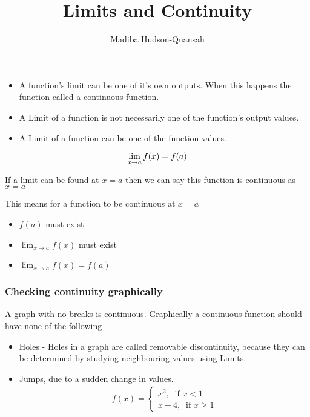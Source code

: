 \documentclass[12pt letter]{report}
\title{\Huge{Limits and Continuity}}
\author{\huge{Madiba Hudson-Quansah}}
\date{}
\begin{document}
\maketitle
\newpage
{}
\tableofcontents
\pagebreak

\chapter{}

\begin{itemize}
	\item A function's limit can be one of it's own outputs. When this happens the function called a continuous function.

	\item A Limit of a function is not necessarily one of the function's output values.

	\item A Limit of a function can be one of the function values.

\end{itemize}

\[
	\lim_{x\to a} f(x) = f(a) \\
\]

If a limit can be found at $x = a$ then we can say this function is continuous as $x = a$

This means for a function to be continuous at $x = a$

\begin{itemize}
	\item $f(a)$ must exist
	\item $\lim_{x \to a} f(x)$ must exist
	\item $\lim_{x\to a} f(x) = f(a)$
\end{itemize}

\subsection{Checking continuity graphically}

A graph with no breaks is continuous. Graphically a continuous function should have none of the following

\begin{itemize}
	\item Holes - Holes in a graph are called removable discontinuity, because they can be determined by studying neighbouring values using Limits.
	\item Jumps, due to a sudden change in values. \begin{align*}
		      f(x) = \begin{cases}
			             x^2, \;\; \text{if } x< 1 \\
			             x + 4, \;\; \text{if } x \geq 1
		             \end{cases}
	      \end{align*}
\end{itemize}
\end{document}
